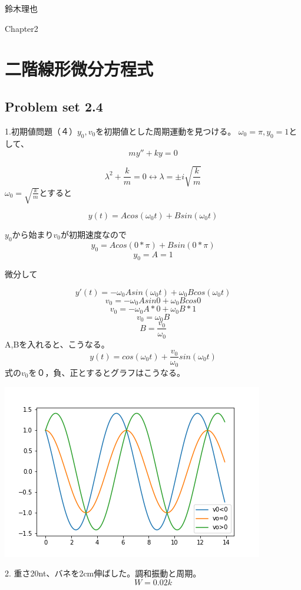 \documentclass[uplatex]{jsarticle}
\begin{document}
\begin{flushright}
  鈴木理也
\end{flushright}

\setcounter{section}{1}
Chapter2
\section{二階線形微分方程式}

\subsection{Problem set 2.4}
\large
1.初期値問題（４）${y_0},{v_0}$を初期値とした周期運動を見つける。
  ${\omega_0}={\pi},{y_0}=1$として、
  $$ my'' + ky =0 $$

  $$ {\lambda}^2 +\frac{k}{m} = 0 \leftrightarrow {\lambda} = \pm i {\sqrt{\frac{k}{m}}}$$ 
  ${\omega_0}={\sqrt{\frac{k}{m}}}$とすると

  $$ y(t) = A cos({\omega_0}t) + B sin({\omega_0}t) $$

${y_0}$から始まり${v_0}$が初期速度なので
$$ y_0 = A cos(0 * \pi) + B sin(0* \pi)$$
$$ y_0= A = 1$$


微分して


$$ y'(t) = -{\omega_0} A sin({\omega_0}t) + {\omega_0} B cos({\omega_0}t) $$
$$ v_0 = -{\omega_0}A sin 0 + {\omega_0}B cos 0 $$
$$ v_0= -{\omega_0}A*0 + {\omega_0}B*1 $$
$$ v_0 = {\omega_0}B $$
$$ B = \frac{v_0}{\omega_0} $$
A,Bを入れると、こうなる。
$$ y(t) = cos({\omega_0}t) + \frac{v_0}{\omega_0} sin({\omega_0}t) $$
式の$v_0$を０，負、正とするとグラフはこうなる。


\includegraphics{./hertz.png}



2. 重さ20nt、バネを2cm伸ばした。調和振動と周期。
$$ W = 0.02k $$
\end{document}
